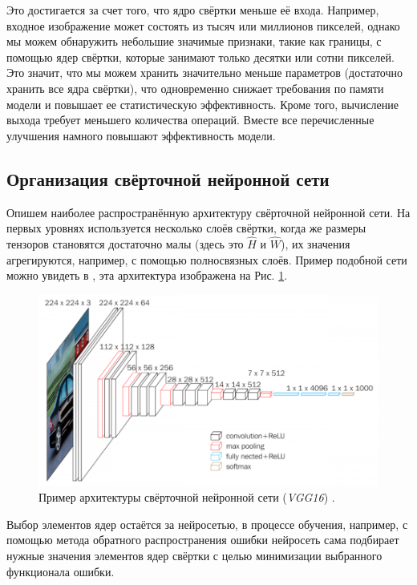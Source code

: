 \documentclass[12pt, fleqn]{article}
\begin{document}
    Это достигается за счет того, что ядро свёртки 
    меньше её входа. Например, входное изображение может состоять из тысяч или миллионов пикселей, однако мы можем 
    обнаружить небольшие значимые признаки, такие как границы, с помощью ядер свёртки, которые занимают 
    только десятки или сотни пикселей. Это значит, что мы можем хранить значительно меньше параметров 
    (достаточно хранить все ядра свёртки), что одновременно снижает 
    требования по памяти модели и повышает ее статистическую эффективность. Кроме того, вычисление выхода 
    требует меньшего количества операций. Вместе все перечисленные улучшения намного повышают эффективность модели.

    \subsection{Организация свёрточной нейронной сети}

    Опишем наиболее распространённую архитектуру свёрточной нейронной сети. На первых уровнях используется
    несколько слоёв свёртки, когда же размеры тензоров становятся достаточно малы (здесь это $\hat{H}$ и $\hat{W}$), 
    их значения агрегируются, например, с помощью полносвязных слоёв. Пример
    подобной сети можно увидеть в \cite{simonyan2014very}, эта архитектура изображена на Рис. \ref{vgg_axample}.

    \begin{figure}[ht]
        \centering
        \includegraphics[scale=0.5]{pics/vgg_example.png}
        \caption{Пример архитектуры свёрточной нейронной сети (\textit{VGG16}) \cite{vgg_pic}.}
        \label{vgg_axample}
    \end{figure}

    Выбор элементов ядер остаётся за нейросетью, в процессе обучения, например, с помощью метода обратного 
    распространения ошибки нейросеть сама подбирает нужные значения элементов ядер свёртки с целью 
    минимизации выбранного функционала ошибки.
\end{document}
